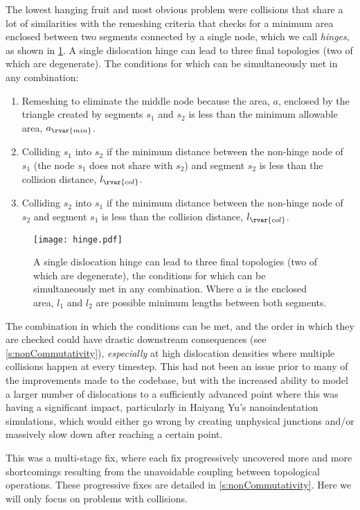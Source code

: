 The lowest hanging fruit and most obvious problem were collisions that share a lot of similarities with the remeshing criteria that checks for a minimum area enclosed between two segments connected by a single node, which we call \emph{hinges}, as shown in \cref{f:hinge}. A single dislocation hinge can lead to three final topologies (two of which are degenerate). The conditions for which can be simultaneously met in any combination:
\begin{enumerate}
    \item Remeshing to eliminate the middle node because the area, $a$, enclosed by the triangle created by segments $s_1$ and $s_2$ is less than the minimum allowable area, $a_{\rvar{min}}$.
    \item Colliding $s_1$ into $s_2$ if the minimum distance between the non-hinge node of $s_1$ (the node $s_1$ does not share with $s_2$) and segment $s_2$ is less than the collision distance, $l_{\rvar{col}}$.
    \item Colliding $s_2$ into $s_1$ if the minimum distance between the non-hinge node of $s_2$ and segment $s_1$ is less than the collision distance, $l_{\rvar{col}}$.
\end{enumerate}
\begin{figure}
    \centering
    \texttt{[image: hinge.pdf]}
    \caption[A single dislocation hinge can lead to three different final topologies.]{A single dislocation hinge can lead to three final topologies (two of which are degenerate), the conditions for which can be simultaneously met in any combination. Where $a$ is the enclosed area, $l_1$ and $l_2$ are possible minimum lengths between both segments.}
    \label{f:hinge}
\end{figure}

The combination in which the conditions can be met, and the order in which they are checked could have drastic downstream consequences (see \cref{s:nonCommutativity}), \emph{especially} at high dislocation densities where multiple collisions happen at every timestep. This had not been an issue prior to many of the improvements made to the codebase, but with the increased ability to model a larger number of dislocations to a sufficiently advanced point where this was having a significant impact, particularly in Haiyang Yu's nanoindentation simulations, which would either go wrong by creating unphysical junctions and/or massively slow down after reaching a certain point.

This was a multi-stage fix, where each fix progressively uncovered more and more shortcomings resulting from the unavoidable coupling between topological operations. These progressive fixes are detailed in \cref{s:nonCommutativity}. Here we will only focus on problems with collisions.

